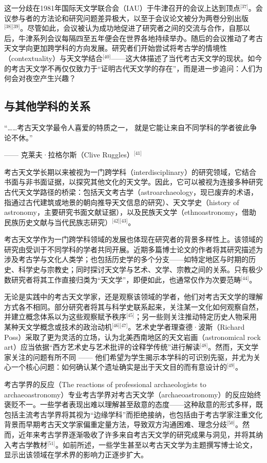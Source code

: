 这一分歧在1981年国际天文学联合会（IAU）于牛津召开的会议上达到顶点\(^\text{[37]}\)。会议参与者的方法论和研究问题差异极大，以至于会议论文被分为两卷分别出版\(^\text{[38][39]}\)。尽管如此，会议被认为成功地促进了研究者之间的交流与合作，自那以后，牛津系列会议每隔四至五年便会在世界各地持续举办。随后的会议推动了考古天文学向更加跨学科的方向发展。研究者们开始尝试将考古学的情境性（contextuality）与天文学结合\(^\text{[40]}\)——这大体描述了当代考古天文学的现状。如今的考古天文学不再仅仅致力于“证明古代天文学的存在”，而是进一步追问：人们为何会对夜空产生兴趣？
\subsection{与其他学科的关系}
“……考古天文学最令人喜爱的特质之一，  
就是它能让来自不同学科的学者彼此争论不休。” 
 
—— 克莱夫·拉格尔斯（Clive Ruggles）\(^\text{[41]}\)

考古天文学长期以来被视为一门跨学科（interdisciplinary）的研究领域，它结合书面与非书面证据，以探究其他文化的天文学。因此，它可以被视为连接多种研究古代天文学路径的桥梁：包括天文考古学（astroarchaeology，现已废弃的术语，指通过古代建筑或地景的朝向推导天文信息的研究）、天文学史（history of astronomy，主要研究书面文献证据），以及民族天文学（ethnoastronomy，借助民族历史文献与当代民族志研究）\(^\text{[42][43]}\)。

考古天文学作为一门跨学科领域的发展也体现在研究者的背景多样性上。该领域的研究由受训于不同学科的学者共同开展。近期多篇博士论文的作者将其研究描述为涉及考古学与文化人类学；也包括历史学的多个分支——如特定地区与时期的历史、科学史与宗教史；同时探讨天文学与艺术、文学、宗教之间的关系。只有极少数研究者将其工作直接归类为“天文学”，即便如此，也通常仅作为次要范畴\(^\text{[44]}\)。

无论是实践中的考古天文学家，还是观察该领域的学者，他们对考古天文学的理解方式各不相同。部分研究者将其与科学史联系起来，关注某一文化如何观察自然，并建立概念体系以为这些观察赋予秩序\(^\text{[45]}\)；另一些则关注推动特定历史人物采用某种天文学概念或技术的政治动机\(^\text{[46][47]}\)。艺术史学者理查德·波斯（Richard Poss）采取了更为灵活的立场，认为北美西南地区的天文岩画（astronomical rock art）应当依据“西方艺术史与艺术批评的诠释学传统”进行解读\(^\text{[48]}\)。然而，天文学家关注的问题有所不同 —— 他们希望为学生揭示本学科的可识别先驱，并尤为关心一个核心问题：如何确认某个遗址确实是出于天文目的而有意设计的\(^\text{[49]}\)。

考古学界的反应（The reactions of professional archaeologists to archaeoastronomy）专业考古学界对考古天文学（archaeoastronomy）的反应始终褒贬不一。一些学者表现出难以理解甚至敌意的态度——这种敌意的形式多样，既包括主流考古学界将其视为“边缘学科”而拒绝接纳，也包括由于考古学家注重文化背景而早期考古天文学家偏重定量方法，导致双方沟通困难、理念分歧\(^\text{[50]}\)。然而，近年来考古学界逐渐吸收了许多来自考古天文学的研究成果与洞见，并将其纳入考古学教材\(^\text{[51]}\)。如前所述，一些学生甚至以考古天文学为主题撰写博士论文，显示出该领域在学术界的影响力正逐步扩大。

